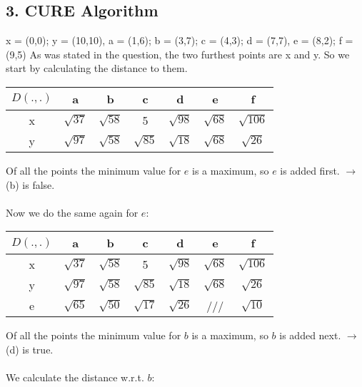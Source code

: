 \documentclass[11pt,a4paper,oneside]{article}
\begin{document}
\subsection*{3. CURE Algorithm}
x = (0,0); y = (10,10), a = (1,6); b = (3,7); c = (4,3); d = (7,7), e = (8,2); f = (9,5)
As was stated in the question, the two furthest points are x and y. So we start by calculating the distance to them.
\begin{table}[H]
\centering
\def\arraystretch{1.2}
\begin{tabular}{|c|c|c|c|c|c|c|}

\hline 
$D(.,.)$ & a & b & c & d & e & f \\ 
\hline 
x & $\sqrt{37}$ & $\sqrt{58}$ & 5 & $\sqrt{98}$ & $\sqrt{68}$ & $\sqrt{106}$ \\ 
\hline 
y & $\sqrt{97}$ & $\sqrt{58}$ & $\sqrt{85}$ & $\sqrt{18}$ & $\sqrt{68}$ & $\sqrt{26}$ \\ 
\hline 
\end{tabular} 
\end{table}
\noindent
Of all the points the minimum value for $e$ is a maximum, so $e$ is added first. $\rightarrow$ (b) is false.
\\
\\
Now we do the same again for $e$:


\begin{table}[H]
\centering
\def\arraystretch{1.2}
\begin{tabular}{|c|c|c|c|c|c|c|}
\hline 
$D(.,.)$ & a & b & c & d & e & f \\ 
\hline 
x & $\sqrt{37}$ & $\sqrt{58}$ & 5 & $\sqrt{98}$ & $\sqrt{68}$ & $\sqrt{106}$ \\ 
\hline 
y & $\sqrt{97}$ & $\sqrt{58}$ & $\sqrt{85}$ & $\sqrt{18}$ & $\sqrt{68}$ & $\sqrt{26}$ \\ 
\hline
e & $\sqrt{65}$ & $\sqrt{50}$ & $\sqrt{17}$ & $\sqrt{26}$ & /// & $\sqrt{10}$ \\
\hline 
\end{tabular} 
\end{table}
\noindent
Of all the points the minimum value for $b$ is a maximum, so $b$ is added next. $\rightarrow$ (d) is true.
\\
\\
We calculate the distance w.r.t. $b$:
\end{document}
